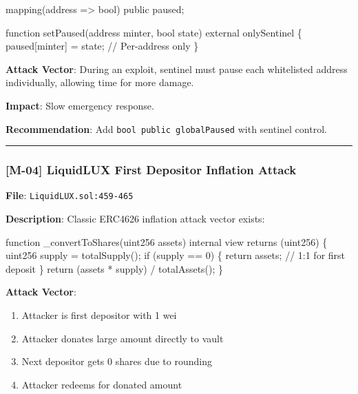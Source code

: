 \documentclass[
]{article}
\newenvironment{Shaded}{}{}
\newcommand{\NormalTok}[1]{#1}
\providecommand{\tightlist}{%
  \setlength{\itemsep}{0pt}\setlength{\parskip}{0pt}}
\begin{document}
\begin{Shaded}
\begin{Highlighting}[]
\NormalTok{mapping(address =\textgreater{} bool) public paused;}

\NormalTok{function setPaused(address minter, bool state) external onlySentinel \{}
\NormalTok{    paused[minter] = state;  // Per{-}address only}
\NormalTok{\}}
\end{Highlighting}
\end{Shaded}

\textbf{Attack Vector}: During an exploit, sentinel must pause each
whitelisted address individually, allowing time for more damage.

\textbf{Impact}: Slow emergency response.

\textbf{Recommendation}: Add \texttt{bool\ public\ globalPaused} with
sentinel control.

\begin{center}\rule{0.5\linewidth}{0.5pt}\end{center}

\subsubsection{{[}M-04{]} LiquidLUX First Depositor Inflation
Attack}\label{m-04-liquidlux-first-depositor-inflation-attack}

\textbf{File}: \texttt{LiquidLUX.sol:459-465}

\textbf{Description}: Classic ERC4626 inflation attack vector exists:

\begin{Shaded}
\begin{Highlighting}[]
\NormalTok{function \_convertToShares(uint256 assets) internal view returns (uint256) \{}
\NormalTok{    uint256 supply = totalSupply();}
\NormalTok{    if (supply == 0) \{}
\NormalTok{        return assets;  // 1:1 for first deposit}
\NormalTok{    \}}
\NormalTok{    return (assets * supply) / totalAssets();}
\NormalTok{\}}
\end{Highlighting}
\end{Shaded}

\textbf{Attack Vector}:

\begin{enumerate}
\def\labelenumi{\arabic{enumi}.}
\tightlist
\item
  Attacker is first depositor with 1 wei
\item
  Attacker donates large amount directly to vault
\item
  Next depositor gets 0 shares due to rounding
\item
  Attacker redeems for donated amount
\end{enumerate}
\end{document}
